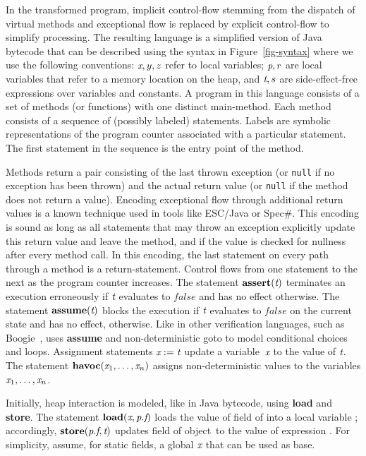 In the transformed program, implicit control-flow stemming from the dispatch 
of virtual methods and exceptional flow is replaced by explicit 
control-flow to simplify processing.
The resulting language is a simplified version of Java bytecode that can be described 
using the syntax in Figure~\ref{fig-syntax} where we use the following 
conventions: $\textit{x}, y, z$ refer to local variables; $\textit{p}, r$ are 
local variables that refer to
a memory location on the heap, and $\textit{t}, s$ are side-effect-free
expressions over variables and constants.  A program in this language
consists of a set of methods (or functions) with one distinct
main-method. Each method consists of a sequence of (possibly
labeled) statements. Labels are symbolic representations of the
program counter associated with a particular statement. The first
statement in the sequence is the entry point of the method. 

Methods
return a pair consisting of the last thrown exception 
(or \texttt{null} if no exception has been thrown) and the actual
return value (or \texttt{null} if the method does not return a
value). Encoding exceptional flow through additional return values
is a known technique used in tools like ESC/Java or 
Spec\#. This encoding
is sound as long as all statements that may throw an exception
explicitly update this return value and leave the method, and if 
the value is checked for nullness after every method call.
In this encoding, 
the last statement on every path through a method is a 
return-statement. Control
flows from one statement to the next as the program counter
increases. 
The statement $\textbf{assert}(\textit{t})$ terminates
an execution erroneously if $\textit{t}$ evaluates to $\mathit{false}$
and has no effect otherwise. 
The statement $\textbf{assume}(\textit{t})$ blocks the execution
if $\textit{t}$ evaluates to $\mathit{false}$ on the current state and has
no effect, otherwise. Like in other verification languages, such as
 Boogie~\cite{Leino:2010:PIV:2175554.2175588}, \jayhorn uses
\textbf{assume} and non-deterministic goto to model
conditional choices and loops. Assignment statements $\textit{x}:=\textit{t}$
update a variable~$\textit{x}$ to the value of $\textit{t}$.  The statement
$\textbf{havoc}(\textit{x}_1,\ldots,\textit{x}_n)$ assigns non-deterministic
values to the variables $\textit{x}_1,\ldots,\textit{x}_n$. 


Initially, heap interaction is modeled, like in Java bytecode, using
\textbf{load} and \textbf{store}.
The statement $\textbf{load}(\textit{x}, \textit{p}.\textit{f})$ loads the value of
field \fvar of \pvar into a local variable
\lvar; accordingly, $\textbf{store}(\textit{p}.\textit{f}, \textit{t})$ updates field
\fvar of object~\pvar to the value of expression \expr. For simplicity, 
assume, for static fields, a global $\textit{x}$ that can be used as base.


